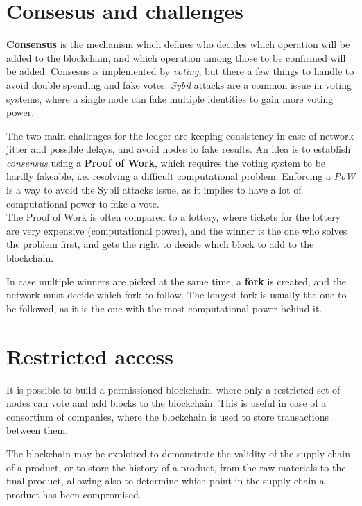 \section{Consesus and challenges}
\textbf{Consensus} is the mechanism which defines who decides which operation will be added to the blockchain, and which operation among those to be confirmed will be added.
Consesus is implemented by \textit{voting}, but there a few things to handle to avoid double spending and fake votes.
\textit{Sybil} attacks are a common issue in voting systems, where a single node can fake multiple identities to gain more voting power.

The two main challenges for the ledger are keeping consistency in case of network jitter and possible delays, and avoid nodes to fake results.
An idea is to establish \textit{consensus} using a \textbf{Proof of Work}, which requires the voting system to be hardly fakeable, i.e. resolving a difficult computational problem.
Enforcing a \textit{PoW} is a way to avoid the Sybil attacks issue, as it implies to have a lot of computational power to fake a vote.\\
The Proof of Work is often compared to a lottery, where tickets for the lottery are very expensive (computational power), and the winner is the one who solves the problem first, and gets the right to decide which block to add to the blockchain.

In case multiple winners are picked at the same time, a \textbf{fork} is created, and the network must decide which fork to follow. The longest fork is usually the one to be followed, as it is the one with the most computational power behind it.

\section{Restricted access}
It is possible to build a permissioned blockchain, where only a restricted set of nodes can vote and add blocks to the blockchain. This is useful in case of a consortium of companies, where the blockchain is used to store transactions between them.

The blockchain may be exploited to demonstrate the validity of the supply chain of a product, or to store the history of a product, from the raw materials to the final product, allowing also to determine which point in the supply chain a product has been compromised.